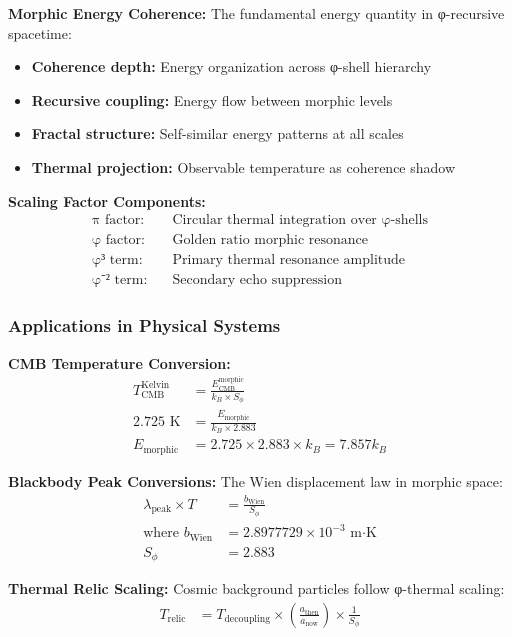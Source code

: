 \textbf{Morphic Energy Coherence:} The fundamental energy quantity in φ-recursive spacetime:
\begin{itemize}
\item \textbf{Coherence depth:} Energy organization across φ-shell hierarchy
\item \textbf{Recursive coupling:} Energy flow between morphic levels
\item \textbf{Fractal structure:} Self-similar energy patterns at all scales
\item \textbf{Thermal projection:} Observable temperature as coherence shadow
\end{itemize}

\textbf{Scaling Factor Components:}
\begin{align}
\text{π factor:} \quad &\text{Circular thermal integration over φ-shells} \\
\text{φ factor:} \quad &\text{Golden ratio morphic resonance} \\
\text{φ³ term:} \quad &\text{Primary thermal resonance amplitude} \\
\text{φ⁻² term:} \quad &\text{Secondary echo suppression}
\end{align}

\subsubsection{Applications in Physical Systems}

\textbf{CMB Temperature Conversion:}
\begin{align}
T_{\text{CMB}}^{\text{Kelvin}} &= \frac{E_{\text{CMB}}^{\text{morphic}}}{k_B \times S_\phi} \\
2.725 \text{ K} &= \frac{E_{\text{morphic}}}{k_B \times 2.883} \\
E_{\text{morphic}} &= 2.725 \times 2.883 \times k_B = 7.857 k_B
\end{align}

\textbf{Blackbody Peak Conversions:}
The Wien displacement law in morphic space:
\begin{align}
\lambda_{\text{peak}} \times T &= \frac{b_{\text{Wien}}}{S_\phi} \\
\text{where } b_{\text{Wien}} &= 2.8977729 \times 10^{-3} \text{ m⋅K} \\
S_\phi &= 2.883
\end{align}

\textbf{Thermal Relic Scaling:}
Cosmic background particles follow φ-thermal scaling:
\begin{align}
T_{\text{relic}} &= T_{\text{decoupling}} \times \left(\frac{a_{\text{then}}}{a_{\text{now}}}\right) \times \frac{1}{S_\phi}
\end{align}

